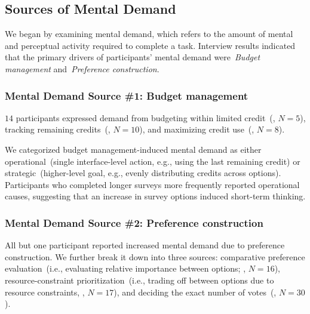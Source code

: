 \subsection{Sources of Mental Demand}
\label{sec:mental}
We began by examining mental demand, which refers to the amount of mental and perceptual activity required to complete a task. Interview results indicated that the primary drivers of participants' mental demand were~\textit{Budget management} and~\textit{Preference construction}.

\subsubsection{Mental Demand Source \#1: Budget management} $14$ participants expressed demand from budgeting within limited credit~(, $N=5$), tracking remaining credits~(, $N=10$), and maximizing credit use~(, $N=8$).

We categorized budget management-induced mental demand as either operational~(single interface-level action, e.g., using the last remaining credit) or strategic~(higher-level goal, e.g., evenly distributing credits across options). Participants who completed longer surveys more frequently reported operational causes, suggesting that an increase in survey options induced short-term thinking.

\subsubsection{Mental Demand Source \#2: Preference construction}
All but one participant reported increased mental demand due to preference construction. We further break it down into three sources: comparative preference evaluation~(i.e., evaluating relative importance between options; , $N=16$), resource-constraint prioritization~(i.e., trading off between options due to resource constraints, , $N=17$), and deciding the exact number of votes~(, $N=30$).


